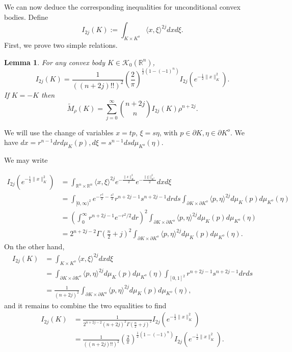 \documentclass[reqno,10pt]{amsart}
\newcounter{mp}
\newtheorem{Lemma}[Proposition]{Lemma}
\newcommand{\R}{\mathbb{R}}
\begin{document}
\endproof

We can now deduce the corresponding inequalities for unconditional convex bodies. 
Define $$I_{2j}(K):=\int_{K\times K^o} \langle x,\xi\rangle^{2j}dxd\xi.$$
First, we prove two simple relations.

\begin{Lemma} For any convex body $K\in\mathcal K_0(\R^n)$,
	\begin{equation}\label{eq:gaussian_body} I_{2j}(K)=\frac{1}{((n+2j)!!)^2} \left(\frac 2\pi \right)^{\frac12(1-(-1)^n)}I_{2j}(e^{-\frac12 \|x\|_K^2}).\end{equation}
	If $K=-K$ then  
	\begin{equation}\label{eq:mahler_to_moments}\widetilde M_\rho(K)= \sum_{j=0}^\infty {n+2j \choose n}I_{2j}(K)\rho^{n+2j}.\end{equation} 
\end{Lemma}
\proof
We will use the change of variables $x=tp$, $\xi=s\eta$, with $p\in\partial K, \eta\in \partial K^o$. We have $dx=r^{n-1}drd\mu_K(p), d\xi =s^{n-1}dsd\mu_{K^o}(\eta)$.

We may write

\begin{align*}I_{2j}(e^{-\frac12 \|x\|_K^2})&=\int_{\R^n\times \R^n}\langle x, \xi\rangle ^{2j}e^{-\frac{\|x\|^2_K}{2}}e^{-\frac{\|\xi\|^2_{K^o}}{2}}dxd\xi\\&=\int_{[0,\infty)^2}e^{-\frac {r^2}{2}-\frac{s^2}{2}}r^{n+2j-1}s^{n+2j-1}drds\int_{\partial K\times\partial K^o}\langle p, \eta\rangle ^{2j}d\mu_K(p)d\mu_{K^o}(\eta)
	\\&=\left(\int_0^\infty r^{n+2j-1} e^{-r^2/2}dr\right)^2\int_{\partial K\times\partial K^o}\langle p, \eta\rangle ^{2j}d\mu_K(p)d\mu_{K^o}(\eta)\\
	&=2^{n+2j-2}\Gamma(\frac{n}{2}+j)^2\int_{\partial K\times\partial K^o}\langle p, \eta\rangle ^{2j}d\mu_K(p)d\mu_{K^o}(\eta).\end{align*}
On the other hand, 
\begin{align*}
	I_{2j}(K)&=\int_{K\times K^o}\langle x, \xi\rangle^{2j}dxd\xi\\&=\int_{\partial K\times \partial K^o} \langle p, \eta\rangle ^{2j}d\mu_K(p)d\mu_{K^o}(\eta)\int_{[0,1]^2}r^{n+2j-1}s^{n+2j-1}drds\\&=\frac{1}{(n+2j)^2}\int_{\partial K\times \partial K^o} \langle p, \eta\rangle ^{2j}d\mu_K(p)d\mu_{K^o}(\eta),
	\end{align*}
and it remains to combine the two equalities to find
\begin{align*} I_{2j}(K)&=\frac{1}{2^{n+2j-2}(n+2j)^2\Gamma(\frac n 2+j )^2}I_{2j}(e^{-\frac12\|x\|^2_K})\\&=\frac{1}{((n+2j)!!)^2} \left(\frac 2\pi \right)^{\frac12(1-(-1)^n)}I_{2j}(e^{-\frac12 \|x\|_K^2}).\end{align*}
\end{document}
